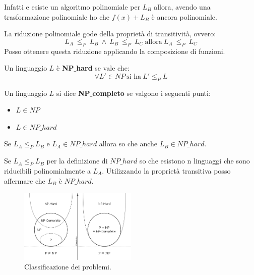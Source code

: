 \begin{dimostrazione}
    Infatti e esiste un algoritmo polinomiale per $L_B$ allora, avendo una
    trasformazione polinomiale ho che $f(x) + L_B$ è ancora polinomiale.
\end{dimostrazione}
\begin{teorema}
    La riduzione polinomiale gode della proprietà di transitività, ovvero:
    \begin{equation}
        L_A \ \leq_P \ L_B \ \land \ L_B \ \leq_P \ L_C \ \text{allora} \ L_A
        \ \leq_P \ L_C
    \end{equation}
    Posso ottenere questa riduzione applicando la composizione di funzioni.
\end{teorema}
\begin{definizione}
    Un linguaggio $L$ è \textbf{NP}$\_$\textbf{hard} se vale che:
    \begin{equation}
        \forall L' \in NP \ \text{si ha} \ L' \leq_P L
    \end{equation}
\end{definizione}
\begin{definizione}
    Un linguaggio $L$ si dice \textbf{NP}$\_$\textbf{completo} se valgono i
    seguenti punti:
    \begin{itemize}
        \item $L \in NP$
        \item $L \in NP\_hard$
    \end{itemize}
\end{definizione}
\begin{teorema}
    Se $L_A \leq_P L_B$ e $L_A \in NP\_hard$ allora so che anche $L_B \in NP\_hard$.
\end{teorema}
\begin{dimostrazione}
    Se $L_A \leq_P L_B$ per la definizione di $NP\_hard$ so che esistono n
    linguaggi che sono riducibili polinomialmente a $L_A$. Utilizzando la
    proprietà transitiva posso affermare che $L_B$ è $NP\_hard$.
\end{dimostrazione}
\begin{figure}[!ht]
    \centering
    \includegraphics[width=0.5\textwidth]{img/MacchineTuring/classificazioneProblemi.png}
    \caption{Classificazione dei problemi.}
\end{figure}
